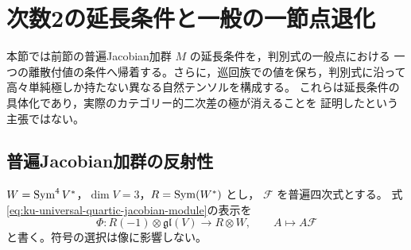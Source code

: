 \section{次数2の延長条件と一般の一節点退化}
\label{sec:kuznetsov-nodal-extension}

本節では前節の普遍Jacobian加群 $M$ の延長条件を，判別式の一般点における
一つの離散付値の条件へ帰着する。さらに，巡回族での値を保ち，判別式に沿って
高々単純極しか持たない異なる自然テンソルを構成する。
これらは延長条件の具体化であり，実際のカテゴリー的二次差の極が消えることを
証明したという主張ではない。

\subsection{普遍Jacobian加群の反射性}

$W=\operatorname{Sym}^4V^*$，$\dim V=3$，$R=\operatorname{Sym}(W^*)$ とし，
$\mathcal F$ を普遍四次式とする。
式\eqref{eq:ku-universal-quartic-jacobian-module}の表示を
\[
 \Phi:R(-1)\otimes\mathfrak{gl}(V)\longrightarrow R\otimes W,
 \qquad A\longmapsto A\mathcal F
\]
と書く。符号の選択は像に影響しない。

